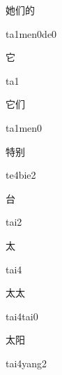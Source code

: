 \begin{multicols*}{2}
\begin{verbete}[ta1men0de0]{她们的}
\begin{pronuncia}{ta1men0de0}
\end{pronuncia}
\end{verbete}

\begin{verbete}[ta1]{它}
\begin{pronuncia}{ta1}
\end{pronuncia}
\end{verbete}

\begin{verbete}[ta1men0]{它们}
\begin{pronuncia}{ta1men0}
\end{pronuncia}
\end{verbete}

\begin{verbete}[te4bie2]{特别}
\begin{pronuncia}{te4bie2}
\end{pronuncia}
\end{verbete}

\begin{verbete}[tai2]{台}
\begin{pronuncia}{tai2}
\end{pronuncia}
\end{verbete}

\begin{verbete}[tai4]{太}
\begin{pronuncia}{tai4}
\end{pronuncia}
\end{verbete}

\begin{verbete}{太太}
\begin{pronuncia}{tai4tai0}
\end{pronuncia}
\end{verbete}

\begin{verbete}{太阳}
\begin{pronuncia}{tai4yang2}
\end{pronuncia}
\end{verbete}


\end{multicols*}
